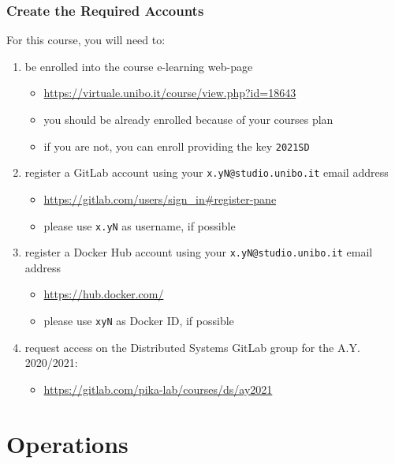 \documentclass[handout]{beamer}\mode<presentation>{\usetheme{AMSCesenaPurpleAndGold}}
\begin{document}
\begin{frame}\label{configure-accounts}
\frametitle{Create the Required Accounts}
    
    For this course, you will need to:
    \begin{enumerate}
        \item be enrolled into the course e-learning web-page
        \begin{itemize}
            \item \url{https://virtuale.unibo.it/course/view.php?id=18643}
            \item you should be already enrolled because of your courses plan
            \item if you are not, you can enroll providing the key \alert{\texttt{2021SD}}
        \end{itemize}
        
        \item register a GitLab account using your \alert{\texttt{x.yN@studio.unibo.it}} email address
        \begin{itemize}
            \item \url{https://gitlab.com/users/sign_in\#register-pane}
            \item please use \texttt{x.yN} as username, if possible
        \end{itemize}
        
		\item register a Docker Hub account using your \alert{\texttt{x.yN@studio.unibo.it}} email address
		\begin{itemize}
			\item \url{https://hub.docker.com/}
			\item please use \texttt{xyN} as Docker ID, if possible
		\end{itemize}
        
        \item request access on the Distributed Systems GitLab group for the A.Y. 2020/2021:
        \begin{itemize}
            \item \url{https://gitlab.com/pika-lab/courses/ds/ay2021}
        \end{itemize}
        
    \end{enumerate}
    
\end{frame}

\section{Operations}
\end{document}

